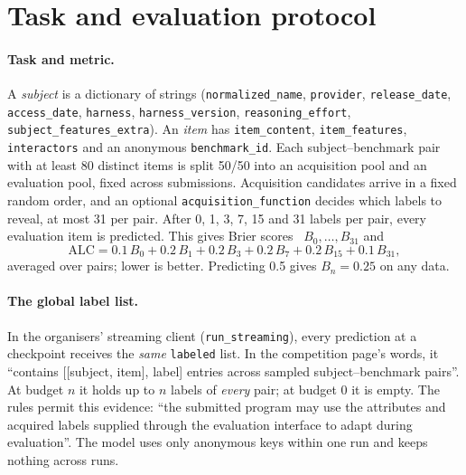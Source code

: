 \documentclass{article}
\begin{document}
\section{Task and evaluation protocol}
\label{sec:task}

\paragraph{Task and metric.} A \emph{subject} is a dictionary of strings (\texttt{normalized\_name}, \texttt{provider}, \texttt{release\_date}, \texttt{access\_date}, \texttt{harness}, \texttt{harness\_version}, \texttt{reasoning\_effort}, \texttt{subject\_features\_extra}). An \emph{item} has \texttt{item\_content}, \texttt{item\_features}, \texttt{interactors} and an anonymous \texttt{benchmark\_id}. Each subject--benchmark pair with at least 80 distinct items is split 50/50 into an acquisition pool and an evaluation pool, fixed across submissions. Acquisition candidates arrive in a fixed random order, and an optional \texttt{acquisition\_function} decides which labels to reveal, at most 31 per pair. After 0, 1, 3, 7, 15 and 31 labels per pair, every evaluation item is predicted. This gives Brier scores~\citep{brier1950} $B_0,\dots,B_{31}$ and
\begin{equation}
\mathrm{ALC} = 0.1\,B_0 + 0.2\,B_1 + 0.2\,B_3 + 0.2\,B_7 + 0.2\,B_{15} + 0.1\,B_{31},
\label{eq:alc}
\end{equation}
averaged over pairs; lower is better. Predicting 0.5 gives $B_n=0.25$ on any data.

\paragraph{The global label list.} In the organisers' streaming client (\texttt{run\_streaming}), every prediction at a checkpoint receives the \emph{same} \texttt{labeled} list. In the competition page's words, it ``contains [[subject, item], label] entries across sampled subject--benchmark pairs''. At budget $n$ it holds up to $n$ labels of \emph{every} pair; at budget 0 it is empty. The rules permit this evidence: ``the submitted program may use the attributes and acquired labels supplied through the evaluation interface to adapt during evaluation''. The model uses only anonymous keys within one run and keeps nothing across runs.
\end{document}
